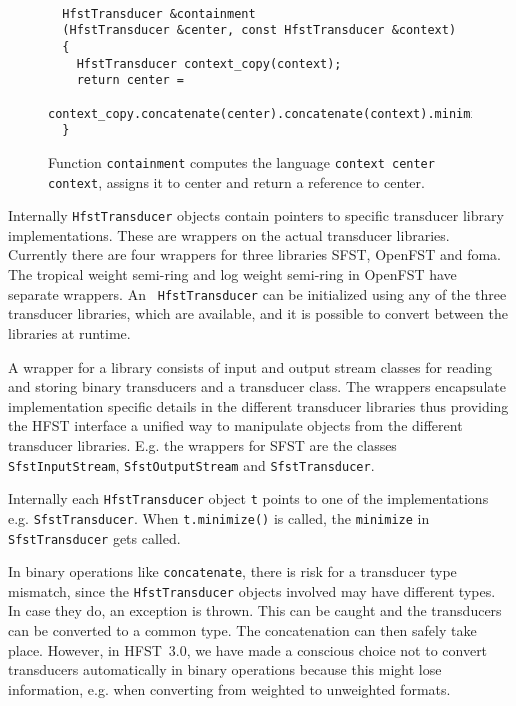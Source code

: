 \documentclass{llncs}
\begin{document}
\begin{figure}
\begin{center}
\caption{Function {\tt containment} computes the language {\tt context center context}, assigns it to center and return a reference to center.}\label{containment-figure}
\begin{verbatim}

  HfstTransducer &containment
  (HfstTransducer &center, const HfstTransducer &context)
  {
    HfstTransducer context_copy(context);
    return center = 
      context_copy.concatenate(center).concatenate(context).minimize();
  }
\end{verbatim}
\end{center}
\end{figure}

Internally {\tt HfstTransducer} objects contain pointers to specific
transducer library implementations. These are wrappers on the actual
transducer libraries. Currently there are four wrappers for three
libraries SFST, OpenFST and foma. The tropical weight semi-ring and log
weight semi-ring in OpenFST have separate wrappers. An {\tt
  HfstTransducer} can be initialized using any of the three transducer
libraries, which are available, and it is possible to convert between
the libraries at runtime.

A wrapper for a library consists of input and output stream classes
for reading and storing binary transducers and a transducer class. The
wrappers encapsulate implementation specific details in the different
transducer libraries thus providing the HFST interface a unified way
to manipulate objects from the different transducer
libraries. E.g. the wrappers for SFST are the classes {\tt
  SfstInputStream}, {\tt SfstOutputStream} and {\tt SfstTransducer}.

Internally each {\tt HfstTransducer} object {\tt t} points to one of
the implementations e.g. {\tt SfstTransducer}. When {\tt t.minimize()}
is called, the {\tt minimize} in {\tt SfstTransducer} gets called. 

In binary operations like {\tt concatenate}, there is risk for a
transducer type mismatch, since the {\tt HfstTransducer} objects
involved may have different types. In case they do, an exception is
thrown. This can be caught and the transducers can be converted to a
common type. The concatenation can then safely take place. 
However, in HFST~3.0, we have made a conscious choice not to convert transducers
automatically in binary operations because this might lose
information, e.g. when converting from weighted to unweighted formats.
\end{document}
